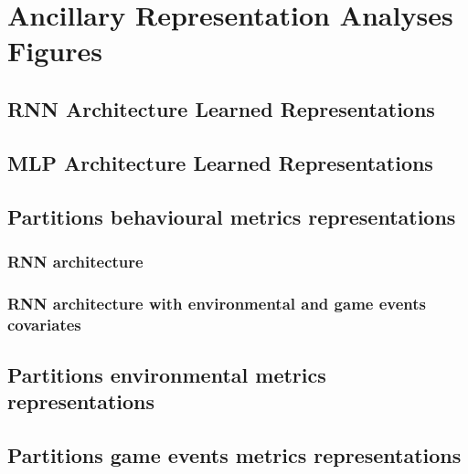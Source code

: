 \chapter{Ancillary Representation Analyses Figures}

\section{RNN Architecture Learned Representations}
\label{rnn_architecture_representations}

\section{MLP Architecture Learned Representations}
\label{mlp_architecture_representations}

\section{Partitions behavioural metrics representations}
\label{partitions_behavioural}

\subsection{RNN architecture}

\subsection{RNN architecture with environmental and game events covariates }

\section{Partitions environmental metrics representations}
\label{partitions_environmental}

\section{Partitions game events metrics representations}
\label{partitions_game_events}